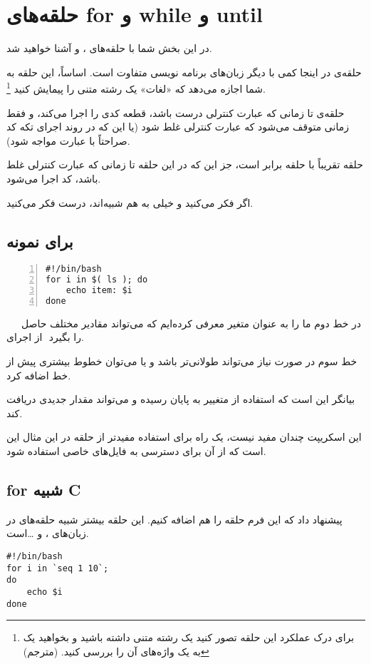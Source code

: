 \chapter{حلقه‌های {\codefont for} و {\codefont while} و {\codefont until}}
در این بخش شما با حلقه‌های ،  و  آشنا خواهید شد‌.

حلقه‌ی \textbf{} در اینجا کمی با دیگر زبان‌های برنامه نویسی متفاوت است‌. اساساً، این حلقه
به شما اجازه می‌دهد که «لغات» یک رشته متنی را پیمایش کنید
\footnote{
برای درک عملکرد این حلقه تصور کنید یک رشته متنی داشته باشید و بخواهید یک به یک واژه‌های
آن را بررسی کنید. (مترجم)
}.

حلقه‌ی \textbf{} تا زمانی که عبارت کنترلی درست باشد‌، قطعه کدی را اجرا می‌کند، و فقط
زمانی متوقف می‌شود که عبارت کنترلی غلط شود (یا این که در روند اجرای تکه کد صراحتاً
با عبارت  مواجه شود).

حلقه \textbf{} تقریباً با حلقه  برابر است‌، جز این که در این حلقه تا زمانی که عبارت
کنترلی غلط باشد، کد اجرا می‌شود.

اگر فکر می‌کنید‌  و  خیلی به هم شبیه‌اند‌، درست فکر می‌کنید‌.
\section*{برای نمونه}
\begin{latin}
\begin{lstlisting}[numbers=left, numberstyle=\color{red}]
#!/bin/bash
for i in $( ls ); do
	echo item: $i
done
\end{lstlisting}
\end{latin}
\quad \ \ \ در خط دوم ما  را به عنوان متغیر معرفی کرده‌ایم که می‌تواند مقادیر مختلف حاصل از
اجرای ‎‎ را بگیرد.

خط سوم در صورت نیاز می‌تواند طولانی‌تر باشد و یا می‌توان خطوط بیشتری پیش از خط 
اضافه کرد.

 بیانگر این است که استفاده از متغییر  به پایان رسیده و  می‌تواند مقدار
جدیدی دریافت کند.

این اسکریپت چندان مفید نیست، یک راه برای استفاده مفید‌تر از حلقه  در این مثال
این ‌است که از آن برای دسترسی به فایل‌های خاصی استفاده شود.

\section*{{\codefont for} شبیه {\codefont C}}
 پیشنهاد داد که این فرم حلقه‌ را هم اضافه کنیم. این حلقه  بیشتر شبیه حلقه‌های
 در زبان‌های ،  و \ldots است.
\begin{latin}
\begin{lstlisting}
#!/bin/bash
for i in `seq 1 10`;
do
	echo $i
done
\end{lstlisting}
\end{latin}

